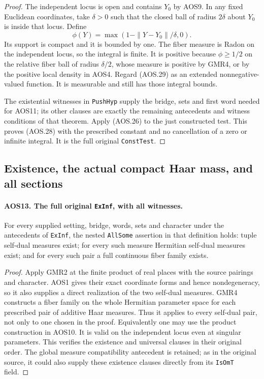 \begin{proof}
The independent locus is open and contains $Y_0$ by AOS9.  In any
fixed Euclidean coordinates, take $\delta>0$ such that the closed
ball of radius $2\delta$ about $Y_0$ is inside that locus.  Define
\[
             \phi(Y)=\max(1-\|Y-Y_0\|/\delta,0).
 \tag{AOS.29}
\]
Its support is compact and it is bounded by one.  The fiber measure
is Radon on the independent locus, so the integral is finite.
It is positive because $\phi\geq1/2$ on the relative fiber ball of
radius $\delta/2$, whose measure is positive by GMR4, or by the
positive local density in AOS4.  Regard (AOS.29) as an extended
nonnegative-valued function.  It is measurable and still has those
integral bounds.

The existential witnesses in \texttt{PushHyp} supply the bridge,
sets and first word needed for AOS11; its other clauses are exactly
the remaining antecedents and witness conditions of that theorem.
Apply (AOS.26) to the just constructed test.  This proves (AOS.28)
with the prescribed constant and no cancellation of a zero or
infinite integral.  It is the full original \texttt{ConstTest}.
\end{proof}

\subsection{Existence, the actual compact Haar mass, and all sections}

\paragraph{AOS13. The full original \texttt{ExInf}, with all witnesses.}
\label{claim:AOS13}
For every supplied setting, bridge, words, sets and character under
the antecedents of \texttt{ExInf}, the nested \texttt{AllSome} assertion
in that definition holds: tuple self-dual measures exist; for every
such measure Hermitian self-dual measures exist; and for every such
pair a full continuous fiber family exists.

\begin{proof}
Apply GMR2 at the finite product of real places with the source
pairings and character.  AOS1 gives their exact coordinate forms
and hence nondegeneracy, so it also supplies a direct realization
of the two self-dual measures.  GMR4 constructs a fiber family on
the whole Hermitian parameter space for each prescribed pair of
additive Haar measures.  Thus it applies to every self-dual pair,
not only to one chosen in the proof.  Equivalently one may use the
product construction in AOS10.  It is valid on the independent
locus even at singular parameters.  This verifies the existence
and universal clauses in their original order.  The global measure
compatibility antecedent is retained; as in the original source,
it could also supply these existence clauses directly from its
\texttt{IsOmT} field.
\end{proof}

